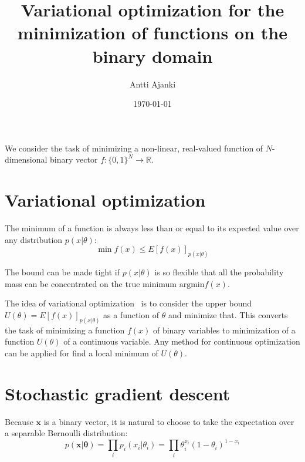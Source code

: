 \documentclass{article}
\title{Variational optimization for the minimization of functions on the binary domain}
\date{\today}
\author{Antti Ajanki}
\renewcommand{\vec}[1]{\boldsymbol{#1}}
\begin{document}
\maketitle

We consider the task of minimizing a non-linear, real-valued function of
$N$-dimensional binary vector $f\colon \{0, 1\}^N \to \mathbb{R}$.

\section{Variational optimization}

The minimum of a function is always less than or equal to its
expected value over any distribution $p(x | \theta)$:
\[
\min f(x) \leq E\left[f(x)\right]_{p(x | \theta)}
\]

The bound can be made tight if $p(x | \theta)$ is so flexible that all
the probability mass can be concentrated on the true minimum
$\text{argmin} f(x)$.

The idea of variational optimization~\cite{staines2012} is to consider
the upper bound $U(\theta) = E\left[f(x)\right]_{p(x | \theta)}$ as a
function of $\theta$ and minimize that. This converts the task of
minimizing a function $f(x)$ of binary variables to minimization of a
function $U(\theta)$ of a continuous variable. Any method for
continuous optimization can be applied for find a local minimum of
$U(\theta)$.

\section{Stochastic gradient descent}

Because $\vec{x}$ is a binary vector, it is natural to choose to take
the expectation over a separable Bernoulli distribution:
\[
p(\vec{x} | \vec{\theta}) = \prod_i p_i(x_i | \theta_i) = \prod_i
\theta_i^{x_i} (1 - \theta_i)^{1-x_i}
\]
\end{document}
